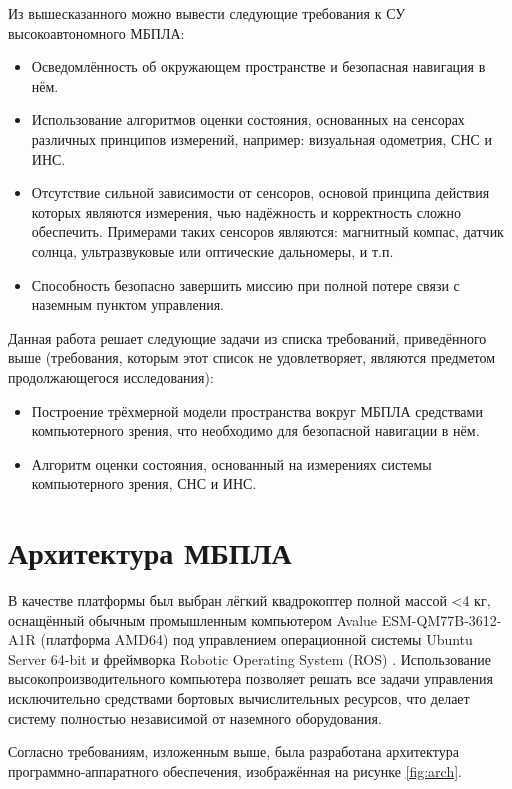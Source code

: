 \documentclass[11pt,a4paper]{article}
\begin{document}
Из вышесказанного можно вывести следующие требования к СУ высокоавтономного МБПЛА:

\begin{itemize}
    \item Осведомлённость об окружающем пространстве и безопасная навигация в нём.
    \item Использование алгоритмов оценки состояния, основанных на сенсорах различных принципов измерений, например: визуальная одометрия, СНС и ИНС.
    \item Отсутствие сильной зависимости от сенсоров, основой принципа действия которых являются измерения, чью надёжность и корректность сложно обеспечить. Примерами таких сенсоров являются: магнитный компас, датчик солнца, ультразвуковые или оптические дальномеры, и т.п.
    \item Способность безопасно завершить миссию при полной потере связи с наземным пунктом управления.
\end{itemize}

Данная работа решает следующие задачи из списка требований, приведённого выше (требования, которым этот список не удовлетворяет, являются предметом продолжающегося исследования):

\begin{itemize}
    \item Построение трёхмерной модели пространства вокруг МБПЛА средствами компьютерного зрения, что необходимо для безопасной навигации в нём.
    \item Алгоритм оценки состояния, основанный на измерениях системы компьютерного зрения, СНС и ИНС.
\end{itemize}

\section{Архитектура МБПЛА}

В качестве платформы был выбран лёгкий квадрокоптер полной массой <4 кг, оснащённый обычным промышленным компьютером Avalue ESM-QM77B-3612-A1R (платформа AMD64) под управлением операционной системы Ubuntu Server 64-bit и фреймворка Robotic Operating System (ROS) \cite{ROS}. Использование высокопроизводительного компьютера позволяет решать все задачи управления исключительно средствами бортовых вычислительных ресурсов, что делает систему полностью независимой от наземного оборудования.

Согласно требованиям, изложенным выше, была разработана архитектура программно-аппаратного обеспечения, изображённая на рисунке \ref{fig:arch}.
\end{document}
